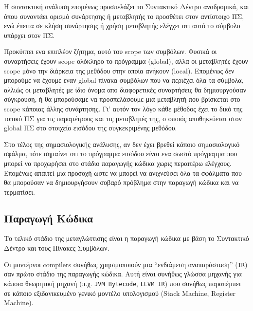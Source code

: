 \documentclass[a4paper,11pt]{article}
\newcommand{\eng}[1]{\foreignlanguage{english}{#1}}
\newcommand{\tech}[1]{\foreignlanguage{english}{\texttt{#1}}}
\begin{document}
Η συντακτική ανάλυση επομένως προσπελάζει το Συντακτικό Δέντρο αναδρομικά, και
όπου συναντάει ορισμό συνάρτησης ή μεταβλητής το προσθέτει στον αντίστοιχο ΠΣ, ενώ
έπειτα σε κλήση συνάρτησης ή χρήση μεταβλητής ελέγχει οτι αυτό το σύμβολο υπάρχει
στον ΠΣ.

Προκύπτει ενα επιπλέον ζήτημα, αυτό του \eng{scope} των συμβόλων. Φυσικά οι συναρτήσεις
έχουν \eng{scope} ολόκληρο το πρόγραμμα (\eng{global}), αλλα οι μεταβλητές έχουν 
\eng{scope} μόνο την διάρκεια της μεθόδου στην οποία ανήκουν (\eng{local}). 
Επομένως δεν μπορούμε να έχουμε εναν \eng{global} πίνακα συμβόλων που να περιέχει 
όλα τα σύμβολα, αλλιώς οι μεταβλητές με ίδιο όνομα απο διαφορετικές συναρτήσεις 
θα δημιουργούσαν σύγκρουση, ή θα μπορούσαμε να προσπελάσουμε μια μεταβλητή που βρίσκεται
στο \eng{scope} κάποιας άλλης συνάρτησης. Γι' αυτόν τον λόγο κάθε μέθοδος έχει το δικό 
της τοπικό ΠΣ για τις παραμέτρους και τις μεταβλητές της, ο οποιός αποθηκεύεται στον 
\eng{global} ΠΣ στο στοιχείο εισόδου της συγκεκριμένης μεθόδου.

Στο τέλος της σημασιολογικής ανάλυσης, αν δεν έχει βρεθεί κάποιο σημασιολογικό σφάλμα, 
τότε σημαίνει οτι το πρόγραμμα εισόδου είναι ενα σωστό πρόγραμμα που μπορεί να προχωρήσει 
στο στάδιο παραγωγής κώδικα χωρις περαιτέρω ελέγχους. Επομένως απαιτεί μια προσοχή
ωστε να μπορεί να ανιχνεύσει όλα τα σφάλματα που θα μπορούσαν να δημιουργήσουν σοβαρό 
πρόβλημα στην παραγωγή κώδικα και να τερματίσει.

\subsection{Παραγωγή Κώδικα}
Το τελικό στάδιο της μεταγλώττισης είναι η παραγωγή κώδικα με βάση το Συντακτικό Δέντρο
και τους Πίνακες Συμβόλων. 

Οι μοντέρνοι \eng{compilers} συνήθως χρησιμοποιούν μια
\enquote{ενδιάμεση αναπαράσταση} (\tech{IR}) σαν πρώτο στάδιο της παραγωγής κώδικα.
Αυτή είναι συνήθως γλώσσα μηχανής για κάποια θεωρητική μηχανή (π.χ. \tech{JVM Bytecode},
\tech{LLVM IR}) που συνήθως παραπέμπει σε κάποιο εξιδανικευμένο γενικό μοντέλο υπολογισμού 
(\eng{Stack Machine}, \eng{Register Machine}). 
\end{document}
